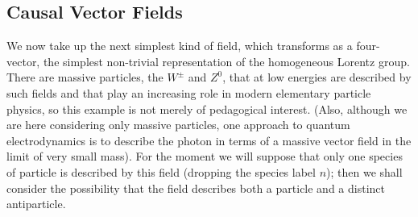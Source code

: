 
\subsection{Causal Vector Fields}

We now take up the next simplest kind of field, which transforms as a
four-vector, the simplest non-trivial representation of the homogeneous
Lorentz group. There are massive particles, the $W^\pm$ and $Z^0$, that at
low energies are described by such fields and that play an increasing role in
modern elementary particle physics, so this example is not merely of
pedagogical interest. (Also, although we are here considering only massive
particles, one approach to quantum electrodynamics is to describe the photon
in terms of a massive vector field in the limit of very small mass). For the
moment we will suppose that only one species of particle is described by this
field (dropping the species label $n$); then we shall consider the possibility
that the field describes both a particle and a distinct antiparticle.

